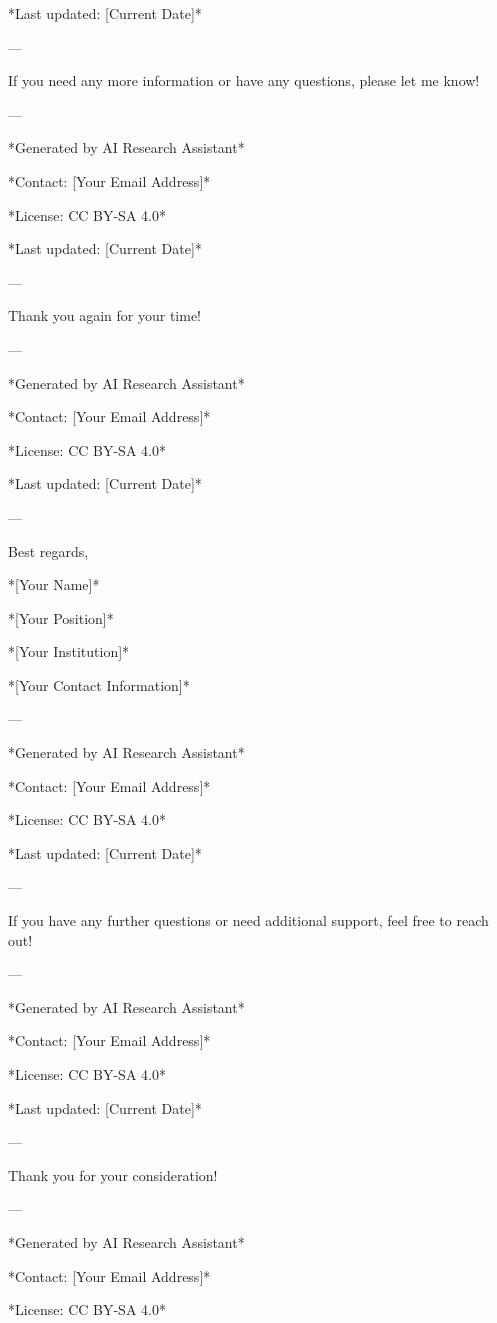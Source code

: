 *Last updated: [Current Date]* 

--- 

If you need any more information or have any questions, please let me know! 

--- 

*Generated by AI Research Assistant* 

*Contact: [Your Email Address]* 

*License: CC BY-SA 4.0* 

*Last updated: [Current Date]* 

--- 

Thank you again for your time! 

--- 

*Generated by AI Research Assistant* 

*Contact: [Your Email Address]* 

*License: CC BY-SA 4.0* 

*Last updated: [Current Date]* 

--- 

Best regards, 

*[Your Name]* 

*[Your Position]* 

*[Your Institution]* 

*[Your Contact Information]* 

--- 

*Generated by AI Research Assistant* 

*Contact: [Your Email Address]* 

*License: CC BY-SA 4.0* 

*Last updated: [Current Date]* 

--- 

If you have any further questions or need additional support, feel free to reach out! 

--- 

*Generated by AI Research Assistant* 

*Contact: [Your Email Address]* 

*License: CC BY-SA 4.0* 

*Last updated: [Current Date]* 

--- 

Thank you for your consideration! 

--- 

*Generated by AI Research Assistant* 

*Contact: [Your Email Address]* 

*License: CC BY-SA 4.0* 


